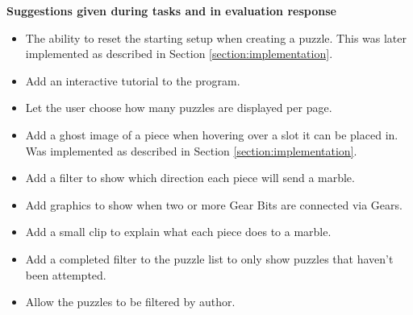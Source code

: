 \documentclass{l4proj}
\begin{document}
\textbf{Suggestions given during tasks and in evaluation response}
\label{suggestions}
\begin{itemize}
    \item The ability to reset the starting setup when creating a puzzle. This was later implemented as described in Section \ref{section:implementation}.
    \item Add an interactive tutorial to the program.
    \item Let the user choose how many puzzles are displayed per page.
    \item Add a ghost image of a piece when hovering over a slot it can be placed in. Was implemented as described in Section \ref{section:implementation}.
    \item Add a filter to show which direction each piece will send a marble.
    \item Add graphics to show when two or more Gear Bits are connected via Gears.
    \item Add a small clip to explain what each piece does to a marble.
    \item Add a completed filter to the puzzle list to only show puzzles that haven't been attempted.
    \item Allow the puzzles to be filtered by author.
\end{itemize}
\end{document}
